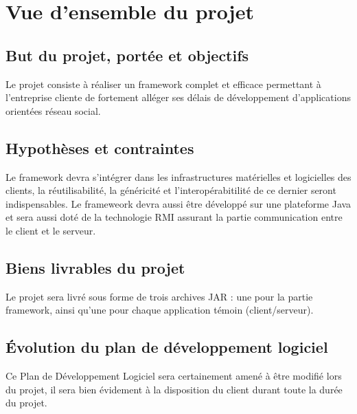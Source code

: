 
\section{Vue d’ensemble du projet}
\subsection{But du projet, portée et objectifs}
Le projet consiste à réaliser un framework complet et efficace permettant à l'entreprise cliente de fortement alléger ses délais de développement d'applications orientées réseau social.

\subsection{Hypothèses et contraintes}
Le framework devra s'intégrer dans les infrastructures matérielles et logicielles des clients, la réutilisabilité, la généricité et l'interopérabitilité de ce dernier seront indispensables.
Le frameweork devra aussi être développé sur une plateforme Java et sera aussi doté de la technologie RMI assurant la partie communication entre le client et le serveur.

\subsection{Biens livrables du projet}
Le projet sera livré sous forme de trois archives JAR : une pour la partie framework,
ainsi qu'une pour chaque application témoin (client/serveur).

\subsection{Évolution du plan de développement logiciel}
Ce Plan de Développement Logiciel sera certainement amené à être modifié lors du projet, il sera bien évidement à la disposition du client durant toute la durée du projet.
